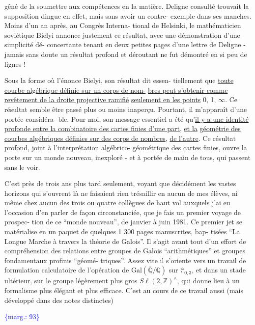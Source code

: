 \documentclass[11pt]{article}
\newcommand{\scanpage}[1]{\par\bigskip\noindent{\small\sffamily[scan #1]}\par}
\newcommand{\mspage}[1]{{\small\sffamily[p.\,#1]}}
\newcommand{\margin}[1]{\textcolor{blue}{\{\textsf{marg.:} #1\}}}
\newcommand{\uline}[1]{\underline{#1}}
\begin{document}
gêné de la soumettre aux compétences en la matière. Deligne consulté
trouvait la supposition dingue en effet, mais sans avoir un contre-%
exemple dans ses manches. Moins d'un an après, au Congrès Interna-%
tional de Helsinki, le mathématicien soviétique Bielyi annonce
justement ce résultat, avec une démonstration d'une simplicité dé-%
concertante tenant en deux petites pages d'une lettre de Deligne -
jamais sans doute un résultat profond et déroutant ne fut démontré
en si peu de lignes !

Sous la forme où l'énonce Bielyi, son résultat dit essen-%
tiellement que \uline{toute courbe algébrique définie sur un corps de nom-}%
\uline{bres peut s'obtenir comme revêtement de la droite projective ramifié}
\uline{seulement en les points} 0, 1, $\infty$. Ce résultat semble être passé plus
ou moins inaperçu. Pourtant, il m'apparaît d'une portée considéra-%
ble. Pour moi, son message essentiel a été qu'\uline{il y a une identité}
\uline{profonde entre la combinatoire des cartes finies d'une part}, \uline{et la}
\uline{géométrie des courbes algébriques définies sur des corps de nombres},
\uline{de l'autre}. Ce résultat profond, joint à l'interprétation algébrico-%
géométrique des cartes finies, ouvre la porte sur un monde nouveau,
inexploré - et à portée de main de tous, qui passent sans le voir.

C'est près de trois ans plus tard seulement, voyant que
décidément les vastes horizons qui s'ouvrent là ne faisaient rien
trésaillir en aucun de mes élèves, ni même chez aucun des trois ou
quatre collègues de haut vol auxquels j'ai eu l'occasion d'en parler
de façon circonstanciée, que je fais un premier voyage de prospec-%
tion de ce ``monde nouveau'', de janvier à juin 1981. Ce premier jet se
matérialise en un paquet de quelques 1 300 pages manuscrites, bap-%
tisées ``La Longue Marche à travers la théorie de Galois''. Il s'agit
avant tout d'un effort de compréhension des relations entre groupes
de Galois ``arithmétiques'' et groupes fondamentaux profinis ``géomé-%
triques''. Assez vite il s'oriente vers un travail de formulation
calculatoire de l'opération de $\mathrm{Gal}(\bar{\mathbb{Q}}/\mathbb{Q})$ sur $\hat{\pi}_{0,3}$, et dans un
stade ultérieur, sur le groupe légèrement plus gros $S\ell(2,\mathbb{Z})^{\wedge}$, qui
donne lieu à un formalisme plus élégant et plus efficace. C'est au
cours de ce travail aussi (mais développé dans des notes distinctes)

\margin{93}

\clearpage
\scanpage{119/94}
\mspage{16}
\end{document}
